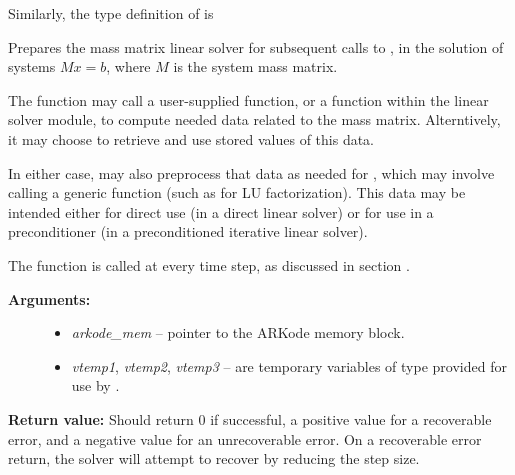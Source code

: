 \documentclass[letterpaper,10pt,english]{sphinxmanual}
\begin{document}
Similarly, the type definition of {\hyperref[linear_solvers/custom:c.msetup]{\emph{}}} is

\begin{fulllineitems}
\label{linear_solvers/custom:c.msetup}
Prepares the mass matrix linear solver for subsequent calls to
{\hyperref[linear_solvers/custom:c.msolve]{\emph{}}}, in the solution of systems \(M x = b\),
where \(M\) is the system mass matrix.

The {\hyperref[linear_solvers/custom:c.msetup]{\emph{}}} function may call a user-supplied function,
or a function within the linear solver module, to compute needed
data related to the mass matrix.  Alterntively, it may choose to
retrieve and use stored values of this data.

In either case, {\hyperref[linear_solvers/custom:c.msetup]{\emph{}}} may also preprocess that data as
needed for {\hyperref[linear_solvers/custom:c.msolve]{\emph{}}}, which may involve calling a generic
function (such as for LU factorization).  This data may be intended
either for direct use (in a direct linear solver) or for use in a
preconditioner (in a preconditioned iterative linear solver).

The {\hyperref[linear_solvers/custom:c.msetup]{\emph{}}} function is called at every time step, as
discussed in section {\hyperref[Mathematics:mathematics-masssolve]{\emph{}}}.
\begin{description}
\item[{\textbf{Arguments:}}] \leavevmode\begin{itemize}
\item {} 
\emph{arkode\_mem} -- pointer to the ARKode memory block.

\item {} 
\emph{vtemp1}, \emph{vtemp2}, \emph{vtemp3} -- are temporary variables of
type  provided for use by {\hyperref[linear_solvers/custom:c.msetup]{\emph{}}}.

\end{itemize}

\end{description}

\textbf{Return value:}
Should return 0 if successful, a positive value
for a recoverable error, and a negative value for an unrecoverable
error.  On a recoverable error return, the solver will attempt to
recover by reducing the step size.

\end{fulllineitems}
\end{document}
